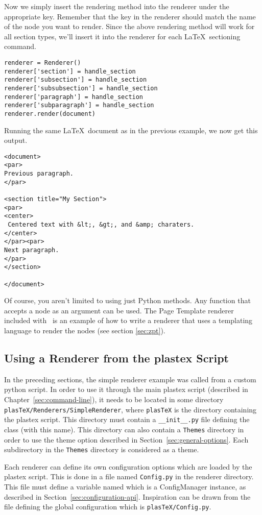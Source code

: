 Now we simply insert the rendering method into the renderer under the
appropriate key.  Remember that the key in the renderer should match
the name of the node you want to render.  Since the above rendering
method will work for all section types, we'll insert it into the
renderer for each \LaTeX\ sectioning command.
\begin{verbatim}
renderer = Renderer()
renderer['section'] = handle_section
renderer['subsection'] = handle_section
renderer['subsubsection'] = handle_section
renderer['paragraph'] = handle_section
renderer['subparagraph'] = handle_section
renderer.render(document)
\end{verbatim}

Running the same \LaTeX\ document as in the previous example, we now get
this output.
\begin{verbatim}
<document>
<par>
Previous paragraph.
</par>

<section title="My Section">
<par>
<center>
 Centered text with &lt;, &gt;, and &amp; charaters.
</center>
</par><par>
Next paragraph.
</par>
</section>

</document>
\end{verbatim}

Of course, you aren't limited to using just Python methods.  Any function
that accepts a node as an argument can be used.  The
Page Template renderer included with \plasTeX\ is an example
of how to write a renderer that uses a templating language to render
the nodes (see section \ref{sec:zpt}).

\subsection{Using a Renderer from the plastex Script}
\label{subsec:renderer-from-script}

In the preceding sections, the simple renderer example was called from
a custom python script. In order to use it through the
main plastex script (described in Chapter~\ref{sec:command-line}), it
needs to be located in some directory
\verb+plasTeX/Renderers/SimpleRenderer+, where \verb+plasTeX+ is the
directory containing the plastex script. This directory must contain a
\verb+__init__.py+ file defining the  class (with this
name). This directory can also contain a \verb+Themes+ directory in
order to use the theme option described in
Section~\ref{sec:general-options}. Each subdirectory in the
\verb+Themes+ directory is considered as a theme.

Each renderer can define its own configuration options which are loaded
by the plastex script. This is done in a file named \verb+Config.py+
in the renderer directory. This file must define a variable named
 which is a ConfigManager instance, as described in
Section~\ref{sec:configuration-api}. Inspiration can be drawn from the
file defining the global configuration which is
\verb+plasTeX/Config.py+.

